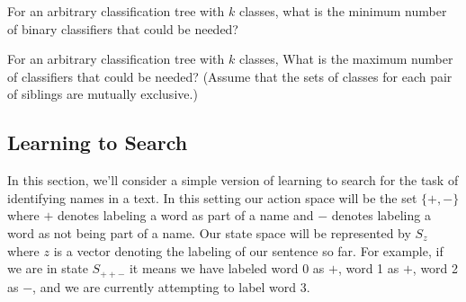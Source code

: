 \documentclass[11pt,addpoints,answers]{exam}
\numberwithin{equation}{section} %
\numberwithin{figure}{section} %
\numberwithin{table}{section} %
\begin{document}
\begin{questions}

\question[1] For an arbitrary classification tree with $k$ classes, what is the minimum number of binary classifiers that could be needed?
    \begin{tcolorbox}[fit,height=1cm, width=2cm, blank, borderline={1pt}{-2pt}]
    \end{tcolorbox}
    
\question[1] For an arbitrary classification tree with $k$ classes, What is the maximum number of classifiers that could be needed? (Assume that the sets of classes for each pair of siblings are mutually exclusive.)
    \begin{tcolorbox}[fit,height=1cm, width=2cm, blank, borderline={1pt}{-2pt}]
    \end{tcolorbox}


\end{questions}

\clearpage
\subsection{Learning to Search}

In this section, we'll consider a simple version of learning to search for the task of identifying names in a text. In this setting our action space will be the set $\{ +, -\}$ where $+$ denotes labeling a word as part of a name and $-$ denotes labeling a word as not being part of a name. Our state space will be represented by $S_z$ where $z$ is a vector denoting the labeling of our sentence so far. For example, if we are in state $S_{++-}$ it means we have labeled word 0 as $+$, word 1 as $+$, word 2 as $-$, and we are currently attempting to label word 3. 
\end{document}
